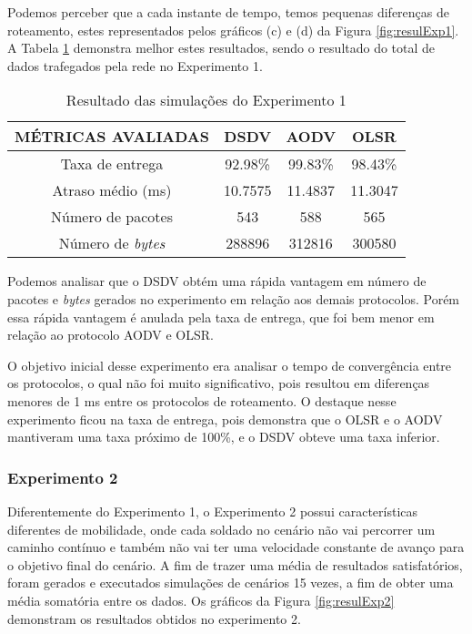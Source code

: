 Podemos perceber que a cada instante de tempo, temos pequenas diferen\c{c}as de roteamento, estes representados pelos gr\'aficos (c) e (d) da Figura \ref{fig:resulExp1}. A Tabela \ref{tabExp1Result} demonstra melhor estes resultados, sendo o resultado do total de dados trafegados pela rede no Experimento 1.

\begin{table}[H]
	\centering
	\caption{Resultado das simula\c{c}\~oes do Experimento 1}
	\begin{tabular}{ | c | c | c | c | }
		\hline
		M\'ETRICAS AVALIADAS & DSDV & AODV & OLSR \\ \hline
		Taxa de entrega & 92.98\% & 99.83\% & 98.43\% \\ \hline
		Atraso m\'edio (ms) & 10.7575 & 11.4837 & 11.3047 \\ \hline
		N\'umero de pacotes & 543 & 588 & 565 \\ \hline
		N\'umero de \textit{bytes} & 288896 & 312816 & 300580 \\ \hline
	\end{tabular}
	\label{tabExp1Result}
\end{table}

Podemos analisar que o DSDV obt\'em uma r\'apida vantagem em n\'umero de pacotes e \textit{bytes} gerados no experimento em rela\c{c}\~ao aos demais protocolos. Por\'em essa r\'apida vantagem \'e anulada pela taxa de entrega, que foi bem menor em rela\c{c}\~ao ao protocolo AODV e OLSR.

O objetivo inicial desse experimento era analisar o tempo de converg\^encia entre os protocolos, o qual n\~ao foi muito significativo, pois resultou em diferen\c{c}as menores de 1 ms entre os protocolos de roteamento. 
O destaque nesse experimento ficou na taxa de entrega, pois demonstra que o OLSR e o AODV mantiveram uma taxa pr\'oximo de 100\%, e o DSDV obteve uma taxa inferior.

\subsubsection{Experimento 2}
Diferentemente do Experimento 1, o Experimento 2 possui caracter\'isticas diferentes de mobilidade, onde cada soldado no cen\'ario n\~ao vai percorrer um caminho cont\'inuo e tamb\'em n\~ao vai ter uma velocidade constante de avan\c{c}o para o objetivo final do cen\'ario.
A fim de trazer uma m\'edia de resultados satisfat\'orios, foram gerados e executados simula\c{c}\~oes de cen\'arios 15 vezes, a fim de obter uma m\'edia somat\'oria entre os dados.
Os gr\'aficos da Figura \ref{fig:resulExp2} demonstram os resultados obtidos no experimento 2.

